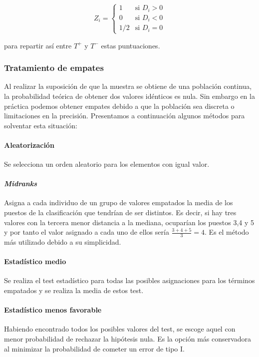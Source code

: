 	\[ Z_i = \left\lbrace \begin{array}{ll}
	 				1 & \text{si } D_i > 0 \\
	 				0 & \text{si } D_i < 0 \\
	 				1/2 & \text{si } D_i = 0 
	 		\end{array} \right. 					\]
	
	para repartir así entre $T^+$ y $T^-$ estas puntuaciones. 
	
\subsubsection{Tratamiento de empates}
	
	Al realizar la suposición de que la muestra se obtiene de 
una población continua, la probabilidad teórica de obtener 
dos valores idénticos es nula. Sin embargo en la práctica 
podemos obtener empates debido a que la población sea 
discreta o limitaciones en la precisión. Presentamos a 
continuación algunos métodos para solventar esta situación:
	
\paragraph{Aleatorización} Se selecciona un orden aleatorio 
para los elementos con igual valor.

\paragraph{\textit{Midranks}} Asigna a cada individuo de un 
grupo de valores empatados la media de los puestos de la 
clasificación que tendrían de ser distintos. Es decir, si hay 
tres valores con la tercera menor distancia a la mediana, 
ocuparían los puestos 3,4 y 5 y por tanto el valor asignado a 
cada uno de ellos sería $\frac{3+4+5}{3}=4$. Es el método más 
utilizado debido a su simplicidad. 

\paragraph{Estadístico medio} Se realiza el test estadístico 
para todas las posibles asignaciones para los términos 
empatados y se realiza la media de estos test.

\paragraph{Estadístico menos favorable} Habiendo encontrado 
todos los posibles valores del test, se escoge aquel con 
menor probabilidad de rechazar la hipótesis nula. Es la 
opción más conservadora al minimizar la probabilidad de 
cometer un error de tipo I.

